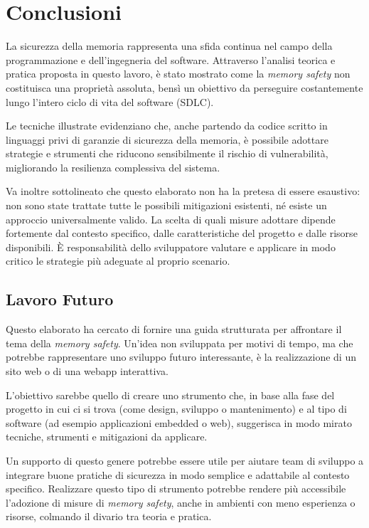 \chapter{Conclusioni}
\label{cha:conclusioni}

La sicurezza della memoria rappresenta una sfida continua nel campo della
programmazione e dell'ingegneria del software. Attraverso l'analisi teorica e pratica
proposta in questo lavoro, è stato mostrato come la \textit{memory safety} non costituisca
una proprietà assoluta, bensì un obiettivo da perseguire costantemente lungo l'intero
ciclo di vita del software (SDLC).

Le tecniche illustrate evidenziano che, anche partendo da codice scritto in linguaggi
privi di garanzie di sicurezza della memoria, è possibile adottare strategie e
strumenti che riducono sensibilmente il rischio di vulnerabilità, migliorando la
resilienza complessiva del sistema.

Va inoltre sottolineato che questo elaborato non ha la pretesa di essere esaustivo:
non sono state trattate tutte le possibili mitigazioni esistenti, né esiste un approccio
universalmente valido. La scelta di quali misure adottare dipende fortemente dal
contesto specifico, dalle caratteristiche del progetto e dalle risorse disponibili.
È responsabilità dello sviluppatore valutare e applicare in modo critico le
strategie più adeguate al proprio scenario.

\section{Lavoro Futuro}
\label{sec:lavoro_futuro}

Questo elaborato ha cercato di fornire una guida strutturata per affrontare il tema
della \textit{memory safety}. Un'idea non sviluppata per motivi di tempo, ma che
potrebbe rappresentare uno sviluppo futuro interessante, è la realizzazione di un
sito web o di una webapp interattiva.

L'obiettivo sarebbe quello di creare uno strumento che, in base alla fase del
progetto in cui ci si trova (come design, sviluppo o mantenimento) e al tipo di software
(ad esempio applicazioni embedded o web), suggerisca in modo mirato tecniche, strumenti
e mitigazioni da applicare.

Un supporto di questo genere potrebbe essere utile per aiutare team di sviluppo a
integrare buone pratiche di sicurezza in modo semplice e adattabile al contesto specifico.
Realizzare questo tipo di strumento potrebbe rendere più accessibile l'adozione
di misure di \textit{memory safety}, anche in ambienti con meno esperienza o
risorse, colmando il divario tra teoria e pratica.


